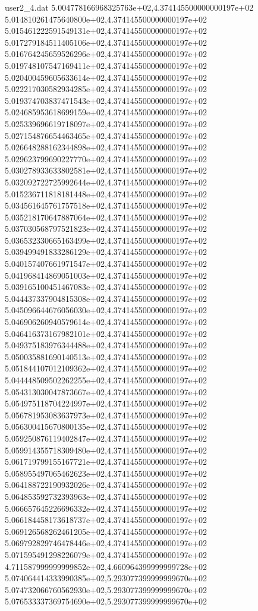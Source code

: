 \begin{filecontents}{user2_4.dat}
5.004778166968325763e+02,4.374145500000000197e+02
5.014810261475640800e+02,4.374145500000000197e+02
5.015461222591549131e+02,4.374145500000000197e+02
5.017279184511405106e+02,4.374145500000000197e+02
5.016764245659526296e+02,4.374145500000000197e+02
5.019748107547169411e+02,4.374145500000000197e+02
5.020400459605633614e+02,4.374145500000000197e+02
5.022217030582934285e+02,4.374145500000000197e+02
5.019374703837471543e+02,4.374145500000000197e+02
5.024685953618699159e+02,4.374145500000000197e+02
5.025339696619718097e+02,4.374145500000000197e+02
5.027154876654463465e+02,4.374145500000000197e+02
5.026648288162344898e+02,4.374145500000000197e+02
5.029623799690227770e+02,4.374145500000000197e+02
5.030278933633802581e+02,4.374145500000000197e+02
5.032092722725992644e+02,4.374145500000000197e+02
5.015236711818181448e+02,4.374145500000000197e+02
5.034561645761757518e+02,4.374145500000000197e+02
5.035218170647887064e+02,4.374145500000000197e+02
5.037030568797521823e+02,4.374145500000000197e+02
5.036532330665163499e+02,4.374145500000000197e+02
5.039499491833286129e+02,4.374145500000000197e+02
5.040157407661971547e+02,4.374145500000000197e+02
5.041968414869051003e+02,4.374145500000000197e+02
5.039165100451467083e+02,4.374145500000000197e+02
5.044437337904815308e+02,4.374145500000000197e+02
5.045096644676056030e+02,4.374145500000000197e+02
5.046906260940579614e+02,4.374145500000000197e+02
5.046416373167982101e+02,4.374145500000000197e+02
5.049375183976344488e+02,4.374145500000000197e+02
5.050035881690140513e+02,4.374145500000000197e+02
5.051844107012109362e+02,4.374145500000000197e+02
5.044448509502262255e+02,4.374145500000000197e+02
5.054313030047873667e+02,4.374145500000000197e+02
5.054975118704224997e+02,4.374145500000000197e+02
5.056781953083637973e+02,4.374145500000000197e+02
5.056300415670800135e+02,4.374145500000000197e+02
5.059250876119402847e+02,4.374145500000000197e+02
5.059914355718309480e+02,4.374145500000000197e+02
5.061719799155167721e+02,4.374145500000000197e+02
5.058955497065462623e+02,4.374145500000000197e+02
5.064188722190932026e+02,4.374145500000000197e+02
5.064853592732393963e+02,4.374145500000000197e+02
5.066657645226696332e+02,4.374145500000000197e+02
5.066184458173618737e+02,4.374145500000000197e+02
5.069126568262461205e+02,4.374145500000000197e+02
5.069792829746478446e+02,4.374145500000000197e+02
5.071595491298226079e+02,4.374145500000000197e+02
4.711587999999999852e+02,4.660964399999999728e+02
5.074064414333990385e+02,5.293077399999999670e+02
5.074732066760562930e+02,5.293077399999999670e+02
5.076533337369754690e+02,5.293077399999999670e+02

\end{filecontents}
